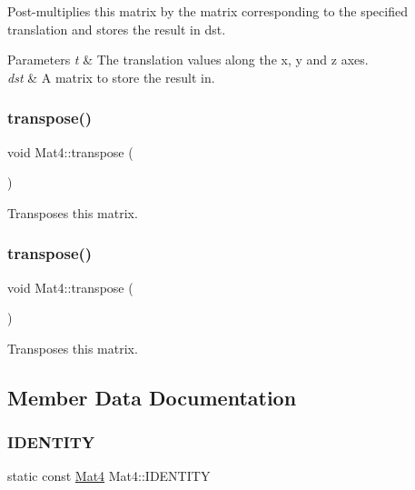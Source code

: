 Post-\/multiplies this matrix by the matrix corresponding to the specified translation and stores the result in dst.


\begin{DoxyParams}{Parameters}
{\em t} & The translation values along the x, y and z axes. \\
\hline
{\em dst} & A matrix to store the result in. \\
\hline
\end{DoxyParams}
\mbox{\label{classMat4_af8b85ea76f3b7225ee33878029b1d18e}} 
\subsubsection{\texorpdfstring{transpose()}{transpose()}\hspace{0.1cm}{\footnotesize\ttfamily [1/2]}}
{\footnotesize\ttfamily void Mat4\+::transpose (\begin{DoxyParamCaption}{ }\end{DoxyParamCaption})}

Transposes this matrix. \mbox{\label{classMat4_af8b85ea76f3b7225ee33878029b1d18e}} 
\subsubsection{\texorpdfstring{transpose()}{transpose()}\hspace{0.1cm}{\footnotesize\ttfamily [2/2]}}
{\footnotesize\ttfamily void Mat4\+::transpose (\begin{DoxyParamCaption}{ }\end{DoxyParamCaption})}

Transposes this matrix. 

\subsection{Member Data Documentation}
\mbox{\label{classMat4_ac4322622c4d5884e00c56d902b2e755b}} 
\subsubsection{\texorpdfstring{I\+D\+E\+N\+T\+I\+TY}{IDENTITY}}
{\footnotesize\ttfamily static const \hyperlink{classMat4}{Mat4} Mat4\+::\+I\+D\+E\+N\+T\+I\+TY\hspace{0.3cm}{\ttfamily [static]}}

